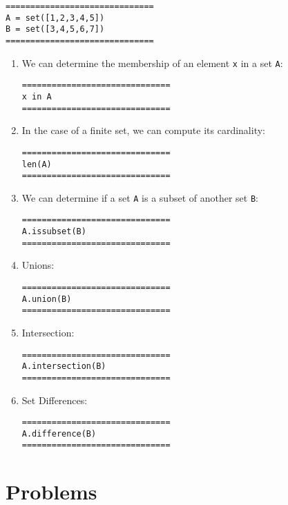 \documentclass{ximera}
\begin{document}
\begin{verbatim}
==============================
A = set([1,2,3,4,5])
B = set([3,4,5,6,7])
==============================
\end{verbatim}
\begin{enumerate}
        \item We can determine the membership of an element \verb|x| in a set \verb|A|:
\begin{verbatim}
==============================	
x in A
==============================
\end{verbatim}
        \item In the case of a finite set, we can compute its cardinality:
\begin{verbatim}
==============================
len(A)
==============================
\end{verbatim}
        \item We can determine if a set \verb|A| is a subset of another set \verb|B|:
\begin{verbatim}
==============================
A.issubset(B)
==============================
\end{verbatim}
        \item Unions:
\begin{verbatim}
==============================
A.union(B)
==============================
\end{verbatim}
        \item Intersection:
\begin{verbatim}
==============================
A.intersection(B)
==============================
\end{verbatim}
        \item Set Differences:
\begin{verbatim}
==============================
A.difference(B)
==============================
\end{verbatim}
    \end{enumerate}

\section{Problems}
\end{document}
